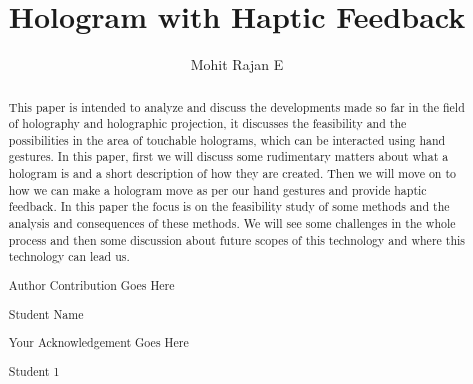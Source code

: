 \documentclass{fisatproject}
\title{Hologram with Haptic Feedback}
\author{Mohit Rajan E}
\begin{document}
\maketitle
\makecert

\newpage
{}
\setcounter{page}{1}
\thispagestyle{plain}
\renewcommand\abstractname{ABSTRACT}
\begin{abstract}
\vspace{5cm}
This paper is intended to analyze and discuss the developments made so far in the field of holography and holographic projection, it discusses the feasibility and the possibilities in the area of touchable holograms, which can be interacted using hand gestures. In this paper, first we will discuss some rudimentary matters about what a hologram is and a short description of how they are created. Then we will move on to how we can make a hologram move as per our hand gestures and provide haptic feedback. In this paper the focus is on the feasibility study of some methods and the analysis and consequences of these methods. We will see some challenges in the whole process and then some discussion about future scopes of this technology and where this technology can lead us.
\end{abstract}



\newpage
\renewcommand\abstractname{Contribution by Author}
\thispagestyle{plain}
\begin{abstract}
\vspace{5cm}
Author Contribution  Goes Here
\vspace{1cm}
\begin{flushright}
Student Name
\end{flushright}
\end{abstract}

\newpage
\renewcommand\abstractname{ACKNOWLEDGMENT}
\thispagestyle{plain}
\begin{abstract}
\vspace{5cm}
Your Acknowledgement Goes Here
\vspace{1cm}
\begin{flushright}
Student 1
\end{flushright}
\end{abstract}
\newpage

\restoregeometry
\tableofcontents
\newpage

\cleardoublepage
{}
\listoffigures
\newpage
\end{document}
